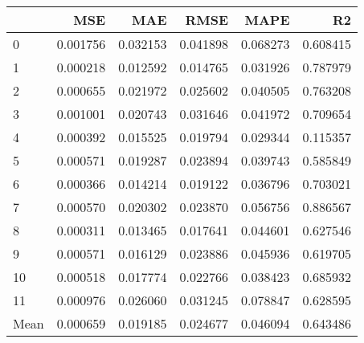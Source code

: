 \begin{tabular}{lrrrrr}
\toprule
 & MSE & MAE & RMSE & MAPE & R2 \\
\midrule
0 & 0.001756 & 0.032153 & 0.041898 & 0.068273 & 0.608415 \\
1 & 0.000218 & 0.012592 & 0.014765 & 0.031926 & 0.787979 \\
2 & 0.000655 & 0.021972 & 0.025602 & 0.040505 & 0.763208 \\
3 & 0.001001 & 0.020743 & 0.031646 & 0.041972 & 0.709654 \\
4 & 0.000392 & 0.015525 & 0.019794 & 0.029344 & 0.115357 \\
5 & 0.000571 & 0.019287 & 0.023894 & 0.039743 & 0.585849 \\
6 & 0.000366 & 0.014214 & 0.019122 & 0.036796 & 0.703021 \\
7 & 0.000570 & 0.020302 & 0.023870 & 0.056756 & 0.886567 \\
8 & 0.000311 & 0.013465 & 0.017641 & 0.044601 & 0.627546 \\
9 & 0.000571 & 0.016129 & 0.023886 & 0.045936 & 0.619705 \\
10 & 0.000518 & 0.017774 & 0.022766 & 0.038423 & 0.685932 \\
11 & 0.000976 & 0.026060 & 0.031245 & 0.078847 & 0.628595 \\
Mean & 0.000659 & 0.019185 & 0.024677 & 0.046094 & 0.643486 \\
\bottomrule
\end{tabular}
